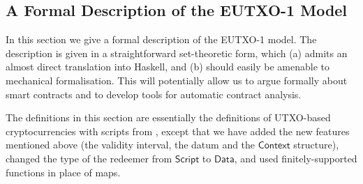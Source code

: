 \documentclass[a4paper]{article}
\newcommand{\s}{\textsf}  %
\newcommand{\script}{\ensuremath{\s{Script}}}
\newcommand{\ctx}{\ensuremath{\s{Context}}}
\newcommand{\Data}{\ensuremath{\s{Data}}}
\begin{document}
\subsection{A Formal Description of the EUTXO-1 Model}
\label{section:eutxo-spec}

In this section we give a formal description of the EUTXO-1 model.  The
description is given in a straightforward set-theoretic form, which
(a) admits an almost direct translation into Haskell, and (b) should
easily be amenable to mechanical formalisation.  This will potentially
allow us to argue formally about smart contracts and to develop tools
for automatic contract analysis.

The definitions in this section are essentially the definitions of
UTXO-based cryptocurrencies with scripts from
\citep{Zahnentferner18-UTxO}, except that we have added the new
features mentioned above (the validity interval, the datum
and the \ctx{} structure), changed the type of the redeemer from
\script{} to \Data{}, and used finitely-supported functions in place
of maps.
\end{document}
